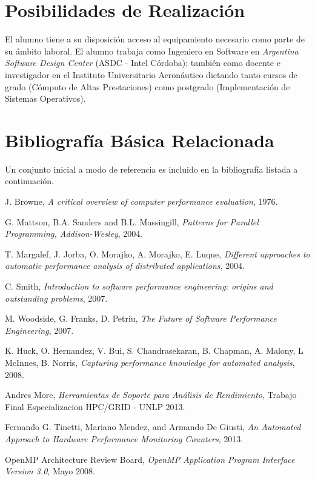 \documentclass[a4paper]{article}
\begin{document}
\section{Posibilidades de Realización}

El alumno tiene a su disposición acceso al equipamiento necesario como parte de su ámbito laboral.
El alumno trabaja como Ingeniero en Software en {\it Argentina Software Design Center} (ASDC - Intel Córdoba); también como docente e investigador en el Instituto Universitario Aeronáutico dictando tanto cursos de grado (Cómputo de Altas Prestaciones) como postgrado (Implementación de Sistemas Operativos).

\section{Bibliografía Básica Relacionada}

Un conjunto inicial a modo de referencia es incluido en la bibliografía listada a continuación.

\begin{thebibliography}{9}
  
 J. Browne,
 \emph{A critical overview of computer performance evaluation},
 1976.

 G. Mattson, B.A. Sanders and B.L. Massingill, 
 \emph{Patterns for Parallel Programming, Addison-Wesley},
 2004.

 T. Margalef, J. Jorba, O. Morajko, A. Morajko, E. Luque,
 \emph{Different approaches to automatic performance analysis of distributed applications},
 2004.

 C. Smith,
 \emph{Introduction to software performance engineering: origins and outstanding problems},
 2007.

 M. Woodside, G. Franks, D. Petriu,
 \emph{The Future of Software Performance Engineering},
 2007.

 K. Huck, O. Hernandez, V. Bui, S. Chandrasekaran, B. Chapman, A. Malony, L McInnes, B. Norris,
 \emph{Capturing performance knowledge for automated analysis},
 2008.

  Andres More,
 \emph{Herramientas de Soporte para Análisis de Rendimiento},
 Trabajo Final Especializacion HPC/GRID - UNLP 2013.

  Fernando G. Tinetti, Mariano Mendez, and Armando De Giusti,
  \emph{An Automated Approach to Hardware Performance Monitoring Counters},
  2013. 

  OpenMP Architecture Review Board,
  \emph{OpenMP Application Program Interface Version 3.0},
  Mayo 2008.

\end{thebibliography}
\end{document}
